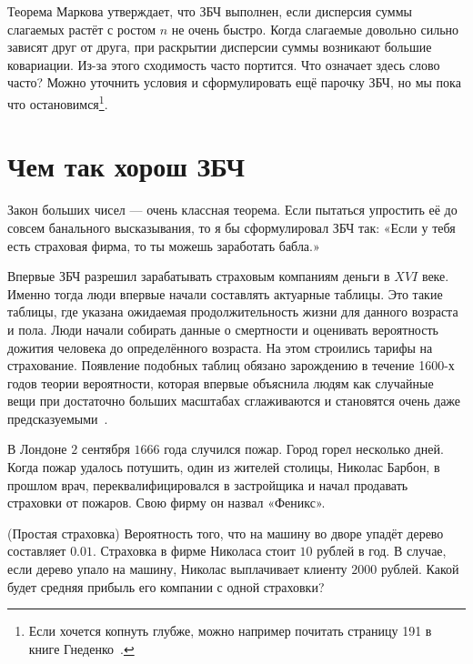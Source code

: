 \documentclass[12pt, a4paper, oneside]{article}
\begin{document}
Теорема Маркова утверждает, что ЗБЧ выполнен, если дисперсия суммы слагаемых растёт с ростом $n$ не очень быстро. Когда слагаемые довольно сильно зависят друг от друга, при раскрытии дисперсии суммы возникают большие ковариации. Из-за этого сходимость часто портится. Что означает здесь слово часто? Можно уточнить условия и сформулировать ещё парочку ЗБЧ, но мы пока что остановимся\footnote{Если хочется копнуть глубже, можно например почитать страницу 191 в книге Гнеденко~\cite{ref:gnedenko}.}.


\section{Чем так хорош ЗБЧ}

Закон больших чисел --- очень классная теорема. Если пытаться упростить её до совсем банального высказывания, то я бы сформулировал ЗБЧ так: «Если у тебя есть страховая фирма, то ты можешь заработать бабла.» 

Впервые ЗБЧ разрешил зарабатывать страховым компаниям деньги в $XVI$ веке. Именно тогда люди впервые начали составлять актуарные таблицы. Это такие таблицы, где указана ожидаемая продолжительность жизни для данного возраста и пола. Люди начали собирать данные о смертности и оценивать вероятность дожития человека до определённого возраста. На этом строились тарифы на страхование. Появление подобных таблиц обязано зарождению в течение 1600-х годов теории вероятности, которая впервые объяснила людям как случайные вещи при достаточно больших масштабах сглаживаются и становятся очень даже предсказуемыми~\cite{zhlobolite}.

В Лондоне $2$ сентября $1666$ года случился пожар. Город горел несколько дней. Когда пожар удалось потушить, один из жителей столицы, Николас Барбон, в прошлом врач, переквалифицировался в застройщика и начал продавать страховки от пожаров. Свою фирму он назвал «Феникс». 

\begin{problem}{(Простая страховка)}
Вероятность того, что на машину во дворе упадёт дерево составляет $0.01$. Страховка в фирме Николаса стоит $10$ рублей в год. В случае, если дерево упало на машину, Николас выплачивает клиенту $2000$ рублей. Какой будет средняя прибыль его компании с одной страховки? 
\end{problem}
\end{document}
